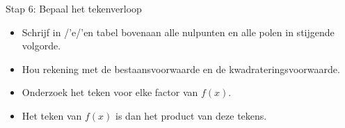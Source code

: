 \begin{framed}
Stap 6: Bepaal het tekenverloop

\begin{itemize}
\item Schrijf in /'e/'en tabel bovenaan alle nulpunten en alle polen in stijgende
volgorde.

\item Hou rekening met de bestaansvoorwaarde en de kwadrateringsvoorwaarde.

\item Onderzoek het teken voor elke factor van $f(x)$.

\item Het teken van $f(x)$ is dan het product van deze tekens.
\end{itemize}

\end{framed}